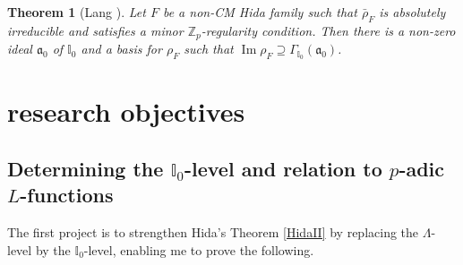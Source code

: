 \documentclass[11pt]{amsart}
\newtheorem{thm}{Theorem}[section]
\theoremstyle{definition}
\theoremstyle{remark}
\def\Aa{\mathfrak{a}}
\def\cc{\mathfrak{c}}
\def\I{\mathbb{I}}
\def\Pp{\mathfrak{P}}
\def\Q{\mathbb{Q}}
\def\Z{\mathbb{Z}}
\DeclareMathOperator{\im}{Im}
\begin{document}
\begin{thm}[Lang \cite{Lang15}]\label{Lang}
Let $F$ be a non-CM Hida family such that $\bar{\rho}_F$ is absolutely irreducible and satisfies a minor $\Z_p$-regularity condition.  Then there is a non-zero ideal $\Aa_0$ of $\I_0$ and a basis for $\rho_F$ such that $\im \rho_F \supseteq \Gamma_{\I_0}(\Aa_0)$.
\end{thm}
%
%
%
%
%
\section*{research objectives}\label{future}
\subsection*{Determining the $\I_0$-level and relation to $p$-adic $L$-functions}
The first project is to strengthen Hida's Theorem \ref{HidaII} by replacing the $\Lambda$-level by the $\I_0$-level, enabling me to prove the following.
\end{document}
